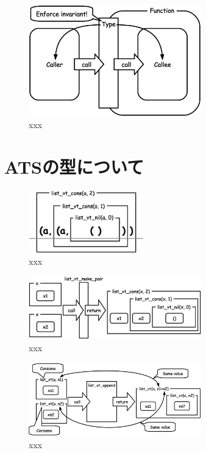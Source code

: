 \documentclass{ipsjprosym}
\begin{document}
\begin{figure}[h]
\centering
\includegraphics[width=75mm]{draw/enforce_invariant.eps}
\caption{xxx}
\label{fig:enforce_invariant}
\end{figure}

\section{ATSの型について}

\begin{figure}[h]
\centering
\includegraphics[width=50mm]{draw/list_vt_type.eps}
\caption{xxx}
\label{fig:xxx}
\end{figure}

\begin{figure}[h]
\centering
\includegraphics[width=75mm]{draw/list_vt_make_pair.eps}
\caption{xxx}
\label{fig:xxx}
\end{figure}

\begin{figure}[h]
\centering
\includegraphics[width=75mm]{draw/list_vt_append.eps}
\caption{xxx}
\label{fig:list_vt_append}
\end{figure}
\end{document}
